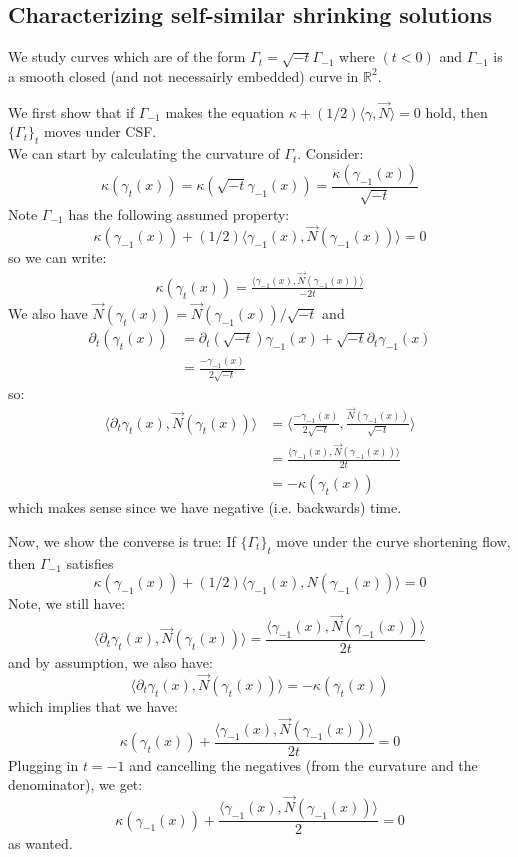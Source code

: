 \documentclass{article}
\begin{document}
\subsection{Characterizing self-similar shrinking solutions}

We study curves which are of the form $\Gamma_t = \sqrt{-t}\Gamma_{-1}$ where $(t < 0)$ and $\Gamma_{-1}$ is a smooth closed (and not necessairly embedded) 
curve in $\mathbb{R}^2$.

We first show that if $\Gamma_{-1}$ makes the equation $\kappa + (1/2)\langle \gamma,\vec{N}\rangle = 0$ hold, then $\{\Gamma_t\}_t$ moves under CSF. \\

We can start by calculating the curvature of $\Gamma_t$. Consider:
\[ \kappa(\gamma_t(x)) = \kappa(\sqrt{-t}\gamma_{-1}(x)) = \frac{\kappa(\gamma_{-1}(x))}{\sqrt{-t}} \]
Note $\Gamma_{-1}$ has the following assumed property:
\[ \kappa(\gamma_{-1}(x)) + (1/2)\langle \gamma_{-1}(x), \vec{N}(\gamma_{-1}(x))\rangle = 0 \]
so we can write:
\begin{align} 
	\kappa(\gamma_t(x)) = \frac{\langle \gamma_{-1}(x), \vec{N}(\gamma_{-1}(x))\rangle}{-2t}
\end{align}
We also have $\vec{N}(\gamma_t(x)) = \vec{N}(\gamma_{-1}(x))/\sqrt{-t}$ and
\begin{align*}
	\partial_t(\gamma_t(x)) &= \partial_t(\sqrt{-t})\gamma_{-1}(x) + \sqrt{-t}\partial_t \gamma_{-1}(x) \\
		&= \frac{-\gamma_{-1}(x)}{2\sqrt{-t}}
\end{align*}
so:
\begin{align*}
	\langle \partial_t \gamma_t(x), \vec{N}(\gamma_{t}(x))\rangle &= \langle \frac{-\gamma_{-1}(x)}{2\sqrt{-t}}, \frac{\vec{N}(\gamma_{-1}(x))}{\sqrt{-t}} \rangle \\
		&= \frac{\langle \gamma_{-1}(x), \vec{N}(\gamma_{-1}(x)) \rangle}{2t} \\
		&= -\kappa(\gamma_t(x))
\end{align*}
which makes sense since we have negative (i.e. backwards) time.

Now, we show the converse is true: If $\{\Gamma_t\}_t$ move under the curve shortening flow, then $\Gamma_{-1}$ satisfies
\[ \kappa(\gamma_{-1}(x)) + (1/2)\langle \gamma_{-1}(x), N(\gamma_{-1}(x))\rangle = 0\] 
Note, we still have:
\[ \langle \partial_t \gamma_t(x), \vec{N}(\gamma_{t}(x))\rangle = \frac{\langle \gamma_{-1}(x), \vec{N}(\gamma_{-1}(x)) \rangle}{2t} \]
and by assumption, we also have:
\[ \langle \partial_t \gamma_t(x), \vec{N}(\gamma_{t}(x))\rangle = -\kappa(\gamma_t(x)) \]
which implies that we have:
\[ \kappa(\gamma_t(x)) + \frac{\langle \gamma_{-1}(x), \vec{N}(\gamma_{-1}(x)) \rangle}{2t} = 0 \]
Plugging in $t=-1$ and cancelling the negatives (from the curvature and the denominator), we get:
\[ \kappa(\gamma_{-1}(x)) + \frac{\langle \gamma_{-1}(x), \vec{N}(\gamma_{-1}(x)) \rangle}{2} = 0 \]
as wanted.\\
\end{document}
